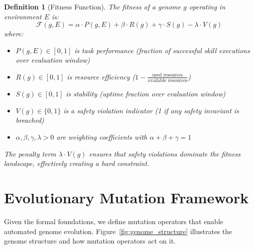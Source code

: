 \documentclass{article}
\newtheorem{definition}{Definition}
\newcommand{\fitnessfn}{\mathcal{F}}
\begin{document}
\begin{definition}[Fitness Function]
The fitness of a genome $g$ operating in environment $E$ is:
\begin{equation}
    \fitnessfn(g, E) = \alpha \cdot P(g, E) + \beta \cdot R(g) + \gamma \cdot S(g) - \lambda \cdot V(g)
    \label{eq:fitness}
\end{equation}
where:
\begin{itemize}[leftmargin=*]
    \item $P(g, E) \in [0,1]$ is task performance (fraction of successful skill executions over evaluation window)
    \item $R(g) \in [0,1]$ is resource efficiency ($1 - \frac{\text{used resources}}{\text{available resources}}$)
    \item $S(g) \in [0,1]$ is stability (uptime fraction over evaluation window)
    \item $V(g) \in \{0,1\}$ is a safety violation indicator (1 if any safety invariant is breached)
    \item $\alpha, \beta, \gamma, \lambda > 0$ are weighting coefficients with $\alpha + \beta + \gamma = 1$
\end{itemize}
The penalty term $\lambda \cdot V(g)$ ensures that safety violations dominate the fitness landscape, effectively creating a hard constraint.
\end{definition}



\section{Evolutionary Mutation Framework}
\label{sec:evolution}

Given the formal foundations, we define mutation operators that enable automated genome evolution. Figure~\ref{fig:genome_structure} illustrates the genome structure and how mutation operators act on it.
\end{document}
